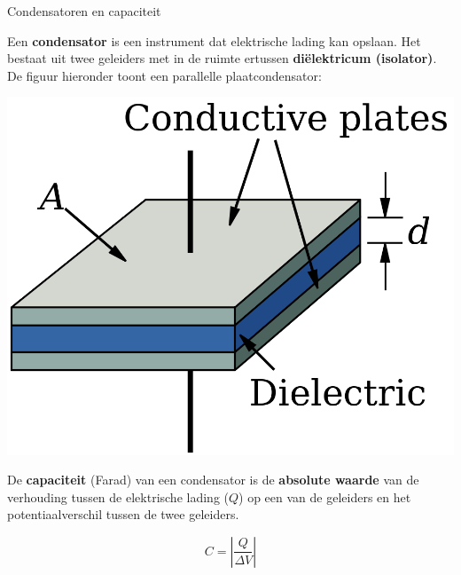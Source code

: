 \begin{theo}{Condensatoren en capaciteit}
    
    Een \textbf{condensator} is een instrument dat elektrische lading kan opslaan. Het bestaat uit twee geleiders met in de ruimte ertussen \textbf{diëlektricum (isolator)}.  De figuur hieronder toont een parallelle plaatcondensator:
    
    \begin{center}
        \includegraphics[scale = 0.125]{Images/Elektriciteit/Condensator.png}
    \end{center}
    
    \noindent De \textbf{capaciteit} (Farad) van een condensator is de \textbf{absolute waarde} van de verhouding tussen de elektrische lading ($ Q $) op een van de geleiders en het potentiaalverschil tussen de twee geleiders.
    
    \begin{equation*}
        C = \left|\frac{Q}{\Delta V}\right|
    \end{equation*}
\end{theo}

